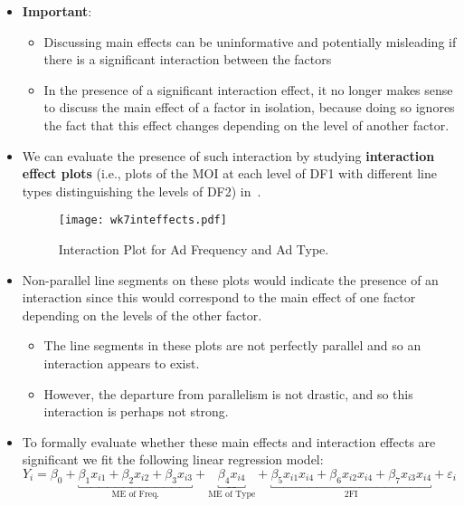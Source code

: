 \begin{itemize}
\begin{itemize}
            \end{itemize}
      \item \textbf{Important}:
            \begin{itemize}
                  \item Discussing main effects can be uninformative and potentially misleading if there is a significant
                        interaction between the factors
                  \item In the presence of a significant interaction effect, it no longer makes sense to discuss the main
                        effect of a factor in isolation, because doing so ignores the fact that this effect changes depending
                        on the level of another factor.
            \end{itemize}
      \item We can evaluate the presence of such interaction by studying \textbf{interaction effect plots} (i.e., plots of the MOI at each
            level of DF1 with different line types distinguishing the levels of DF2) in~.
            \begin{figure}[!htbp]
                  \centering
                  \texttt{[image: wk7inteffects.pdf]}
                  \caption{Interaction Plot for Ad Frequency and Ad Type.}\label{wk7int}
            \end{figure}
      \item Non-parallel line segments on these plots would indicate the presence of an interaction since this would
            correspond to the main effect of one factor depending on the levels of the other factor.
            \begin{itemize}
                  \item The line segments in these plots are not perfectly parallel and so an interaction appears to exist.
                  \item However, the departure from parallelism is not drastic, and so this interaction is perhaps not strong.
            \end{itemize}
      \item To formally evaluate whether these main effects and interaction effects are significant we fit the following
            linear regression model:
            \[ Y_i=\beta_0+\underbracket{\beta_1x_{i1}+\beta_2x_{i2}+\beta_3x_{i3}}_{\text{ME of Freq.}}+\underbracket{\beta_4x_{i4}}_{\text{ME of Type}}+\underbracket{\beta_5x_{i1}x_{i4}+\beta_6x_{i2}x_{i4}+\beta_7x_{i3}x_{i4}}_{2\text{FI}}+\varepsilon_i \]

\end{itemize}
